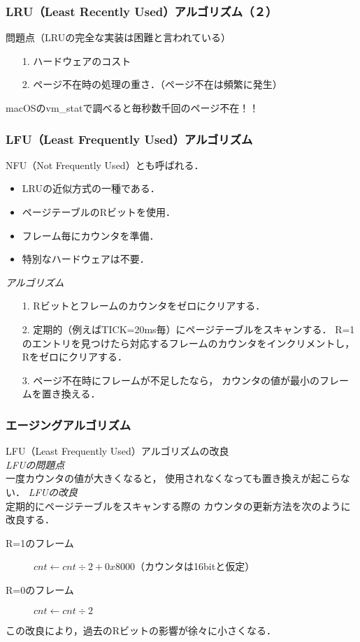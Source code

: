 \documentclass[handout]{beamer}                   %
\begin{document}
\begin{frame}
  \frametitle{LRU（Least Recently Used）アルゴリズム（２）}
  \vspace{3mm}問題点（LRUの完全な実装は困難と言われている）\\
  \begin{enumerate}
  \item[1.] ハードウェアのコスト
  \item[2.] ページ不在時の処理の重さ．（ページ不在は頻繁に発生）
  \end{enumerate}
  macOSのvm\_statで調べると毎秒数千回のページ不在！！
\end{frame}

\begin{frame}
  \frametitle{LFU（Least Frequently Used）アルゴリズム}
  NFU（Not Frequently Used）とも呼ばれる．
  \begin{itemize}
  \item LRUの近似方式の一種である．
  \item ページテーブルのRビットを使用．
  \item フレーム毎にカウンタを準備．
  \item 特別なハードウェアは不要．
  \end{itemize}
  \vfill
  \emph{アルゴリズム}
  \begin{enumerate}
  \item[1.] Rビットとフレームのカウンタをゼロにクリアする．
  \item[2.] 定期的（例えばTICK=20ms毎）にページテーブルをスキャンする．
    R=1のエントリを見つけたら対応するフレームのカウンタをインクリメントし，
    Rをゼロにクリアする．
  \item[3.] ページ不在時にフレームが不足したなら，
    カウンタの値が最小のフレームを置き換える．
  \end{enumerate}
\end{frame}

\begin{frame}
  \frametitle{エージングアルゴリズム}
  LFU（Least Frequently Used）アルゴリズムの改良\\
  \vfill
  \emph{LFUの問題点}\\
  一度カウンタの値が大きくなると，
  使用されなくなっても置き換えが起こらない．
  \vfill
  \emph{LFUの改良}\\
  定期的にページテーブルをスキャンする際の
  カウンタの更新方法を次のように改良する．
  \begin{description}
  \item[R=1のフレーム]
    $cnt \leftarrow cnt \div 2 + 0x8000$（カウンタは16bitと仮定）
  \item[R=0のフレーム]
    $cnt \leftarrow cnt \div 2$
  \end{description}
  この改良により，過去のRビットの影響が徐々に小さくなる．
\end{frame}
\end{document}
